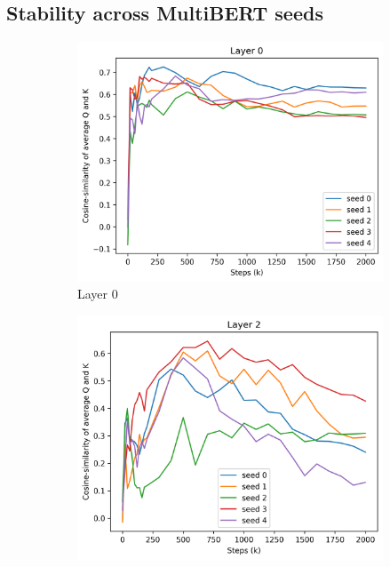 \subsection{Stability across MultiBERT seeds}
\begin{figure}[ht]
    \centering
    \begin{subfigure}[b]{0.24\linewidth}
         \includegraphics[width=\linewidth]{sources/part_1/anisotropy/imgs/seeds_qk_l0.png}
         \caption{Layer 0}
         \label{fig:seeds_l0}
    \end{subfigure}
    \begin{subfigure}[b]{0.24\linewidth}
         \includegraphics[width=\linewidth]{sources/part_1/anisotropy/imgs/seeds_qk_l2.png}

\end{subfigure}
\end{figure}
